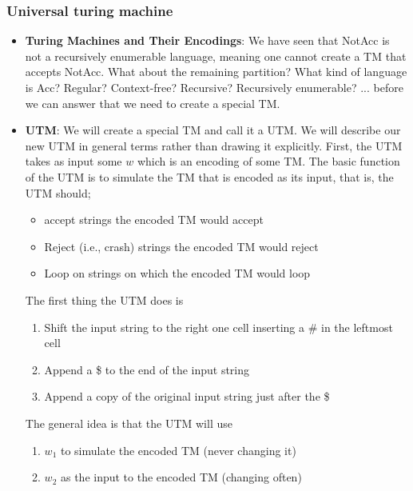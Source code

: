 \documentclass{report}
\begin{document}
    \pagebreak 
    \subsubsection{Universal turing machine}
    \begin{itemize}
        \item \textbf{Turing Machines and Their Encodings}: We have seen that NotAcc is not a recursively enumerable language, meaning one cannot create a TM that accepts NotAcc.
            \bigbreak \noindent 
            What about the remaining partition?
            \bigbreak \noindent 
            What kind of language is Acc? Regular? Context-free? Recursive? Recursively enumerable? ... before we can answer that we need to create a special TM.
        \item \textbf{UTM}: We will create a special TM and call it a UTM. We will describe our new UTM in general terms rather than drawing it explicitly.
            \bigbreak \noindent 
            First, the UTM takes as input some $w$ which is an encoding of some TM.
            \bigbreak \noindent 
            The basic function of the UTM is to simulate the TM that is encoded as its input, that is, the UTM should;
            \begin{itemize}
                \item accept strings the encoded TM would accept
                \item Reject (i.e., crash) strings the encoded TM would reject
                \item Loop on strings on which the encoded TM would loop
            \end{itemize}
            \bigbreak \noindent 
            The first thing the UTM does is
            \begin{enumerate}
                \item Shift the input string to the right one cell inserting a \# in the leftmost cell
                \item Append a \$ to the end of the input string
                \item Append a copy of the original input string just after the \$
            \end{enumerate}
            \bigbreak \noindent 
            The general idea is that the UTM will use
            \begin{enumerate}
                \item $w_{1}$ to simulate the encoded TM (never changing it)
                \item $w_{2}$ as the input to the encoded TM (changing often)

\end{enumerate}
\end{itemize}
\end{document}
